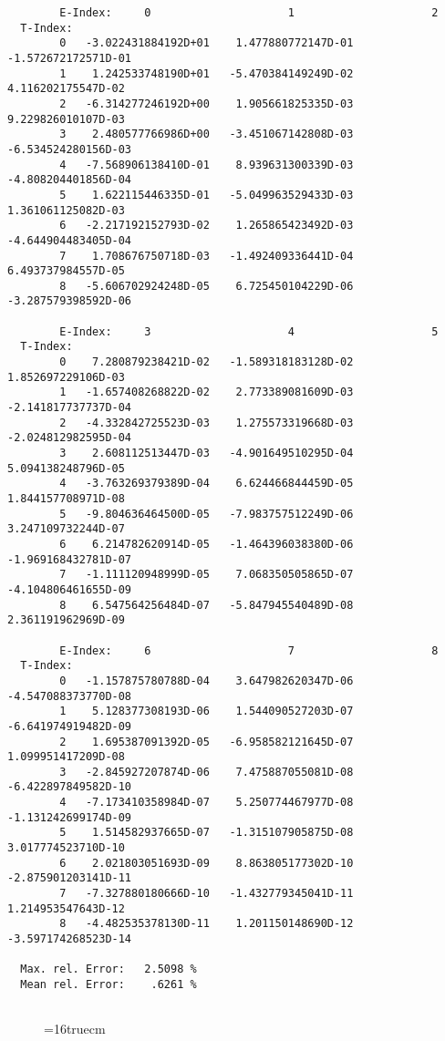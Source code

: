 \documentclass[12pt]{article}
\begin{document}
\begin{small}\begin{verbatim}
        E-Index:     0                     1                     2
  T-Index:
        0   -3.022431884192D+01    1.477880772147D-01   -1.572672172571D-01
        1    1.242533748190D+01   -5.470384149249D-02    4.116202175547D-02
        2   -6.314277246192D+00    1.905661825335D-03    9.229826010107D-03
        3    2.480577766986D+00   -3.451067142808D-03   -6.534524280156D-03
        4   -7.568906138410D-01    8.939631300339D-03   -4.808204401856D-04
        5    1.622115446335D-01   -5.049963529433D-03    1.361061125082D-03
        6   -2.217192152793D-02    1.265865423492D-03   -4.644904483405D-04
        7    1.708676750718D-03   -1.492409336441D-04    6.493737984557D-05
        8   -5.606702924248D-05    6.725450104229D-06   -3.287579398592D-06

        E-Index:     3                     4                     5
  T-Index:
        0    7.280879238421D-02   -1.589318183128D-02    1.852697229106D-03
        1   -1.657408268822D-02    2.773389081609D-03   -2.141817737737D-04
        2   -4.332842725523D-03    1.275573319668D-03   -2.024812982595D-04
        3    2.608112513447D-03   -4.901649510295D-04    5.094138248796D-05
        4   -3.763269379389D-04    6.624466844459D-05    1.844157708971D-08
        5   -9.804636464500D-05   -7.983757512249D-06    3.247109732244D-07
        6    6.214782620914D-05   -1.464396038380D-06   -1.969168432781D-07
        7   -1.111120948999D-05    7.068350505865D-07   -4.104806461655D-09
        8    6.547564256484D-07   -5.847945540489D-08    2.361191962969D-09

        E-Index:     6                     7                     8
  T-Index:
        0   -1.157875780788D-04    3.647982620347D-06   -4.547088373770D-08
        1    5.128377308193D-06    1.544090527203D-07   -6.641974919482D-09
        2    1.695387091392D-05   -6.958582121645D-07    1.099951417209D-08
        3   -2.845927207874D-06    7.475887055081D-08   -6.422897849582D-10
        4   -7.173410358984D-07    5.250774467977D-08   -1.131242699174D-09
        5    1.514582937665D-07   -1.315107905875D-08    3.017774523710D-10
        6    2.021803051693D-09    8.863805177302D-10   -2.875901203141D-11
        7   -7.327880180666D-10   -1.432779345041D-11    1.214953547643D-12
        8   -4.482535378130D-11    1.201150148690D-12   -3.597174268523D-14

  Max. rel. Error:   2.5098 %
  Mean rel. Error:    .6261 %


\end{verbatim}\end{small}
\begin{figure} \label{2.1.5a}
\epsfxsize=16truecm
\end{figure}
\newpage
\end{document}
